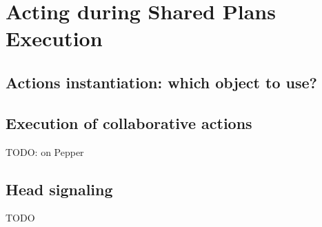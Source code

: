 \documentclass[english,a4paper,11pt,twoside]{StyleThese}
\begin{document}
\setcounter{chapter}{4} %
\dominitoc
\faketableofcontents
\fi

\chapter{Acting during Shared Plans Execution}
\minitoc

\section{Actions instantiation: which object to use?}

\section{Execution of collaborative actions}

TODO: on Pepper

\section{Head signaling}

TODO


\ifdefined{}
\else


\end{document}
